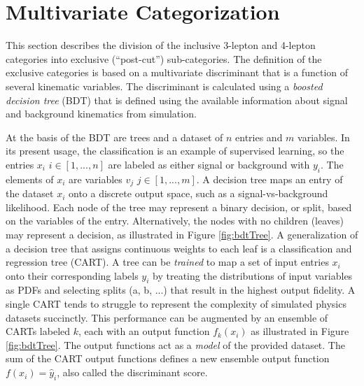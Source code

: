 \section{Multivariate Categorization}\label{sec:hmmBdt}

This section describes the division of the inclusive 3-lepton and 4-lepton categories into exclusive (``post-cut'') sub-categories.
The definition of the exclusive categories is based on a multivariate discriminant that is a function of several kinematic variables.
The discriminant is calculated using a \emph{boosted decision tree} (BDT) that is defined using the available information about signal and background kinematics from simulation.

\begin{figure}[h!]
\captionsetup[subfigure]{position=b}
\centering
{}
\caption{}
\label{fig:}
\end{figure}

At the basis of the BDT are trees and a dataset of $n$ entries and $m$ variables.
In its present usage, the classification is an example of supervised learning, so the entries $x_i$ $i\in[1,...,n]$ are labeled as either signal or background with $y_i$.
The elements of $x_i$ are variables $v_j$ $j\in[1,...,m]$.
A decision tree maps an entry of the dataset $x_i$ onto a discrete output space, such as a signal-vs-background likelihood.
Each node of the tree may represent a binary decision, or split, based on the variables of the entry.
Alternatively, the nodes with no children (leaves) may represent a decision, as illustrated in Figure \ref{fig:bdtTree}.
A generalization of a decision tree that assigns continuous weights to each leaf is a classification and regression tree (CART).
A tree can be \emph{trained} to map a set of input entries $x_i$ onto their corresponding labels $y_i$ by treating the distributions of input variables as PDFs and selecting splits (a, b, ...) that result in the highest output fidelity.
A single CART tends to struggle to represent the complexity of simulated physics datasets succinctly.
This performance can be augmented by an ensemble of CARTs labeled $k$, each with an output function $f_k(x_i)$ as illustrated in Figure \ref{fig:bdtTree}.
The output functions act as a \emph{model} of the provided dataset.
The sum of the CART output functions defines a new ensemble output function $f(x_i)=\hat{y}_i$, also called the discriminant score.

